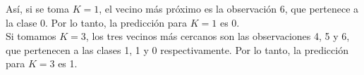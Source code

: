 \begin{example}
Así, si se toma $K = 1$, el vecino más próximo es la observación 6, que pertenece a la clase 0. Por lo tanto, la predicción para $K = 1$ es 0. \\

Si tomamos $K = 3$, los tres vecinos más cercanos son las observaciones 4, 5 y 6, que pertenecen a las clases 1, 1 y 0 respectivamente. Por lo tanto, la predicción para $K = 3$ es 1.
\end{example}